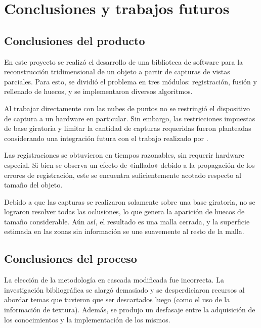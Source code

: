 \chapter{Conclusiones y trabajos futuros}


\section{Conclusiones del producto}
	En este proyecto se realizó el desarrollo de una biblioteca de software para
	la reconstrucción tridimensional de un objeto a partir de capturas de
	vistas parciales.
	Para esto, se dividió el problema en tres módulos: registración, fusión y
	rellenado de huecos, y se implementaron diversos algoritmos.

	Al trabajar directamente con las nubes de puntos no se restringió el
	dispositivo de captura a un hardware en particular. Sin embargo, las
	restricciones impuestas de base giratoria y limitar la cantidad de capturas
	requeridas fueron planteadas considerando una integración futura con
	el trabajo realizado por \cite{Pancho}.

	Las registraciones se obtuvieron en tiempos razonables, sin requerir hardware especial.
	Si bien se observa un efecto de «inflado» debido a la propagación de los errores de registración,
	este se encuentra suficientemente acotado respecto al tamaño del objeto.

	Debido a que las capturas se realizaron solamente sobre una base giratoria,
	no se lograron resolver todas las oclusiones, lo que genera la aparición de huecos de
	tamaño considerable.
	Aún así, el resultado es una malla cerrada, y la
	superficie estimada en las zonas sin información se une suavemente al resto de
	la malla.

\section{Conclusiones del proceso}
La elección de la metodología en cascada modificada fue incorrecta.
La investigación bibliográfica se alargó demasiado y se desperdiciaron recursos
al abordar temas que tuvieron que ser descartados luego (como el uso de la
información de textura).
Además, se produjo un desfasaje entre la adquisición de los conocimientos y la
implementación de los mismos.

